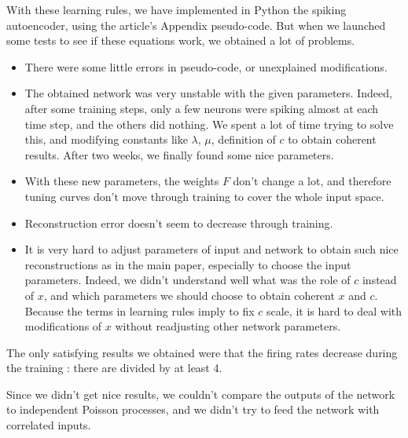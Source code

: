 \documentclass[a4paper,10pt, english]{article}
\begin{document}
With these learning rules, we have implemented in Python the spiking autoencoder, using the article's Appendix pseudo-code.
But when we launched some tests to see if these equations work, we obtained a lot of problems.
\begin{itemize}
 \item There were some little errors in pseudo-code, or unexplained modifications.
 \item The obtained network was very unstable with the given parameters. Indeed, after some training steps,
 only a few neurons were spiking almost at each time step, and the others did nothing. We spent a lot of 
 time trying to solve this, and modifying constants like $\lambda$, $\mu$, definition of $c$ to obtain coherent 
 results. After two weeks, we finally found some nice parameters.
 \item With these new parameters, the weights $F$ don't change a lot, and therefore tuning curves don't move through
 training to cover the whole input space.
 \item Reconstruction error doesn't seem to decrease through training.
 \item It is very hard to adjust parameters of input and network to obtain such nice reconstructions as in 
 the main paper, especially to choose the input parameters. Indeed, we didn't understand well what was the role of $c$ instead of $x$, 
 and which parameters we should choose to obtain coherent $x$ and $c$. Because the terms in learning rules imply to fix $c$ scale, it is hard to deal 
 with modifications of $x$ without readjusting other network parameters.
 
\end{itemize}


The only satisfying results we obtained were that the firing rates decrease during the training : there are divided
by at least 4.

Since we didn't get nice results, we couldn't compare the outputs of the network to independent Poisson processes, and we didn't
try to feed the network with correlated inputs.
\end{document}
